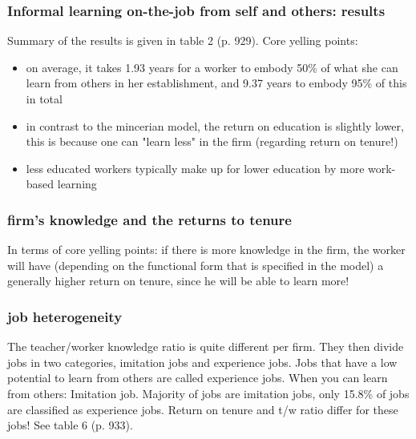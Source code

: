 \documentclass[12pt,a4paper]{article}
\begin{document}
  \subsubsection{Informal learning on-the-job from self and others: results} %
  \label{ssub:Informal learning on-the-job from self and others: results}
  Summary of the results is given in table 2 (p. 929). Core yelling points:
  \begin{itemize}
    \item on average, it takes 1.93 years for a worker to embody 50\% of what she can learn from
      others in her establishment, and 9.37 years to embody 95\% of this in total
    \item in contrast to the mincerian model, the return on education is slightly lower, this is
      because one can "learn less" in the firm (regarding return on tenure!)
    \item less educated workers typically make up for lower education by more work-based learning
  \end{itemize}

  \subsubsection{firm's knowledge and the returns to tenure} %
  \label{ssub:firm's knowledge and the returns to tenure}
  In terms of core yelling points: if there is more knowledge in the firm, the worker will have
  (depending on the functional form that is specified in the model) a generally higher return on
  tenure, since he will be able to learn more!


  \subsubsection{job heterogeneity} %
  \label{ssub:job heterogeneity}
  The teacher/worker knowledge ratio is quite different per firm. They then divide jobs in two
  categories, imitation jobs and experience jobs. Jobs that have a low potential to learn from
  others are called experience jobs. When you can learn from others: Imitation job. Majority of jobs
  are imitation jobs, only 15.8\% of jobs are classified as experience jobs. Return on tenure and
  t/w ratio differ for these jobs!  See table 6 (p. 933).
\end{document}
